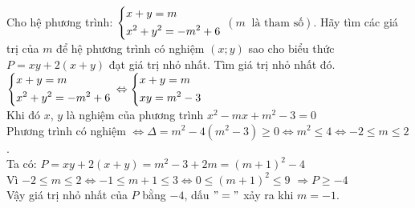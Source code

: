\begin{ex}%
Cho hệ phương trình: $\left\{\begin{aligned}&x+y=m\\&x^2+y^2=-m^2+6\end{aligned}\right.$ $\left(m \;\; \text{là tham số}\right)$.
Hãy tìm các giá trị của $m$ để hệ phương trình có nghiệm $\left(x; y\right)$ sao cho biểu thức $P=xy+2\left(x+y\right)$ đạt giá trị nhỏ nhất. Tìm giá trị nhỏ nhất đó.
\loigiai
    {
    $\left\{\begin{aligned}&x+y=m\\&x^2+y^2=-m^2+6\end{aligned}\right.$ $\Leftrightarrow \left\{\begin{aligned}&x+y=m\\&xy=m^2-3\end{aligned}\right.$ \\
Khi đó $x$, $y$ là nghiệm của phương trình $x^2-mx+m^2-3=0$\\
Phương trình có nghiệm $\Leftrightarrow \Delta = m^2-4(m^2-3) \ge 0 \Leftrightarrow m^2 \le 4 \Leftrightarrow -2\le m \le 2$.\\
Ta có: $P=xy+2\left(x+y\right)=m^2-3+2m=\left(m+1\right)^2-4$\\
Vì $-2\le m \le 2 \Leftrightarrow -1\le m+1 \le 3 \Leftrightarrow 0 \le \left(m+1\right)^2 \le 9$
$\Rightarrow P \ge -4$\\
Vậy giá trị nhỏ nhất của $P$ bằng $-4$, dấu $"="$ xảy ra khi $m=-1$.
    }
\end{ex}
